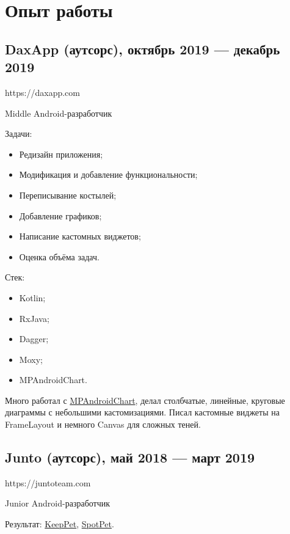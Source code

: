 \documentclass[a4paper,12pt]{article}
\begin{document}
    \section*{Опыт работы}

    \subsection*{DaxApp (аутсорс), октябрь 2019 --- декабрь 2019}

    https://daxapp.com\par
    Middle Android-разработчик

    Задачи:
    \begin{itemize}
        \item Редизайн приложения;
        \item Модификация и добавление функциональности;
        \item Переписывание костылей;
        \item Добавление графиков;
        \item Написание кастомных виджетов;
        \item Оценка объёма задач.
    \end{itemize}

    Стек:
    \begin{itemize}
        \item Kotlin;
        \item RxJava;
        \item Dagger;
        \item Moxy;
        \item MPAndroidChart.
    \end{itemize}

    Много работал с \href{https://github.com/PhilJay/MPAndroidChart}{MPAndroidChart}, делал столбчатые, линейные, круговые диаграммы с небольшими кастомизациями. Писал кастомные виджеты на FrameLayout и немного Canvas для сложных теней.
    
    \subsection*{Junto (аутсорс), май 2018 --- март 2019}
    
    https://juntoteam.com\par
    Junior Android-разработчик
    
    Результат: \href{https://play.google.com/store/apps/details?id=com.juntoteam.keeppet}{KeepPet}, \href{https://play.google.com/store/apps/details?id=com.juntoteam.spotpet}{SpotPet}.
\end{document}
